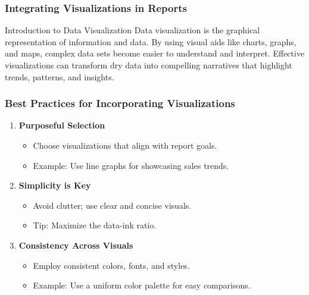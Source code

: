 \documentclass[aspectratio=169]{beamer}
\begin{document}
\begin{frame}[fragile]
    \frametitle{Integrating Visualizations in Reports}
    \begin{block}{Introduction to Data Visualization}
        Data visualization is the graphical representation of information and data. 
        By using visual aids like charts, graphs, and maps, complex data sets become easier to understand and interpret. 
        Effective visualizations can transform dry data into compelling narratives that highlight trends, patterns, and insights.
    \end{block}
\end{frame}

\begin{frame}[fragile]
    \frametitle{Best Practices for Incorporating Visualizations}
    \begin{enumerate}
        \item \textbf{Purposeful Selection}
        \begin{itemize}
            \item Choose visualizations that align with report goals.
            \item Example: Use line graphs for showcasing sales trends.
        \end{itemize}
        
        \item \textbf{Simplicity is Key}
        \begin{itemize}
            \item Avoid clutter; use clear and concise visuals.
            \item Tip: Maximize the data-ink ratio.
        \end{itemize}
        
        \item \textbf{Consistency Across Visuals}
        \begin{itemize}
            \item Employ consistent colors, fonts, and styles.
            \item Example: Use a uniform color palette for easy comparisons.
        \end{itemize}
    \end{enumerate}
\end{frame}
\end{document}
